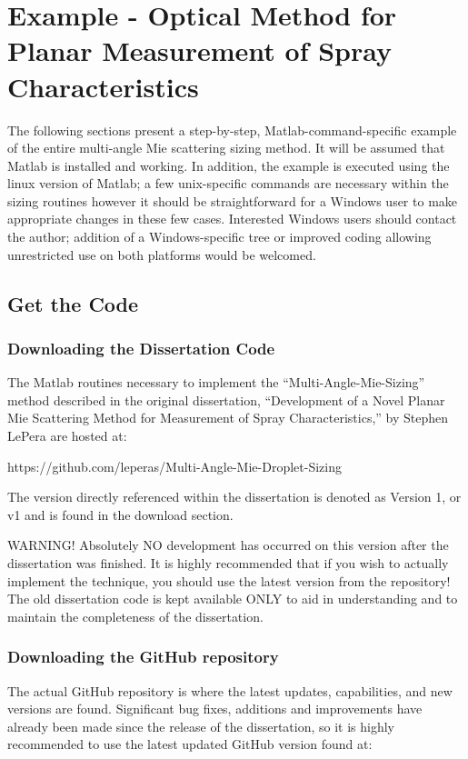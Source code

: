\chapter{Example - Optical Method for Planar Measurement of Spray Characteristics}
\label{step_by_step_example}

The following sections present a step-by-step, Matlab-command-specific example of the entire multi-angle Mie scattering sizing method.  It will be assumed that Matlab is installed and working.  In addition, the example is executed using the linux version of Matlab; a few unix-specific commands are necessary within the sizing routines however it should be straightforward for a Windows user to make appropriate changes in these few cases.  Interested Windows users should contact the author; addition of a Windows-specific tree or improved coding allowing unrestricted use on both platforms would be welcomed.

\section{Get the Code}
\subsection{Downloading the Dissertation Code}
The Matlab routines necessary to implement the ``Multi-Angle-Mie-Sizing'' method described in the original dissertation, ``Development of a Novel Planar Mie Scattering Method for Measurement of Spray Characteristics,'' by Stephen LePera are hosted at:

https://github.com/leperas/Multi-Angle-Mie-Droplet-Sizing

The version directly referenced within the dissertation is denoted as Version 1, or v1 and is found in the download section.

WARNING!  Absolutely NO development has occurred on this version after the dissertation was finished.  It is highly recommended that if you wish to actually implement the technique, you should use the latest version from the repository!  The old dissertation code is kept available ONLY to aid in understanding and to maintain the completeness of the dissertation.

\subsection{Downloading the GitHub repository}

The actual GitHub repository is where the latest updates, capabilities, and new versions are found.  Significant bug fixes, additions and improvements have already been made since the release of the dissertation, so it is highly recommended to use the latest updated GitHub version found at:

